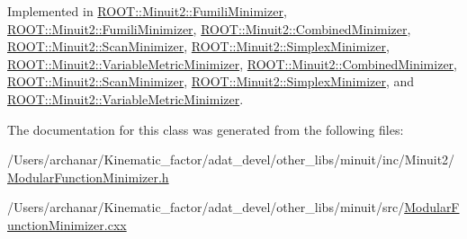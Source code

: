 Implemented in \mbox{\hyperlink{classROOT_1_1Minuit2_1_1FumiliMinimizer_ad8906dbac7f0c20284e361be606d5634}{R\+O\+O\+T\+::\+Minuit2\+::\+Fumili\+Minimizer}}, \mbox{\hyperlink{classROOT_1_1Minuit2_1_1FumiliMinimizer_ad8906dbac7f0c20284e361be606d5634}{R\+O\+O\+T\+::\+Minuit2\+::\+Fumili\+Minimizer}}, \mbox{\hyperlink{classROOT_1_1Minuit2_1_1CombinedMinimizer_a667ce6c321b6948d37087a2ac06be58c}{R\+O\+O\+T\+::\+Minuit2\+::\+Combined\+Minimizer}}, \mbox{\hyperlink{classROOT_1_1Minuit2_1_1ScanMinimizer_aaad34811cf2862cd8b66b634a1c9ba07}{R\+O\+O\+T\+::\+Minuit2\+::\+Scan\+Minimizer}}, \mbox{\hyperlink{classROOT_1_1Minuit2_1_1SimplexMinimizer_a7385d3ee5e4a48a796b11b51f7f0c408}{R\+O\+O\+T\+::\+Minuit2\+::\+Simplex\+Minimizer}}, \mbox{\hyperlink{classROOT_1_1Minuit2_1_1VariableMetricMinimizer_a8ac2123142283dd05611842236caeadb}{R\+O\+O\+T\+::\+Minuit2\+::\+Variable\+Metric\+Minimizer}}, \mbox{\hyperlink{classROOT_1_1Minuit2_1_1CombinedMinimizer_a667ce6c321b6948d37087a2ac06be58c}{R\+O\+O\+T\+::\+Minuit2\+::\+Combined\+Minimizer}}, \mbox{\hyperlink{classROOT_1_1Minuit2_1_1ScanMinimizer_aaad34811cf2862cd8b66b634a1c9ba07}{R\+O\+O\+T\+::\+Minuit2\+::\+Scan\+Minimizer}}, \mbox{\hyperlink{classROOT_1_1Minuit2_1_1SimplexMinimizer_a7385d3ee5e4a48a796b11b51f7f0c408}{R\+O\+O\+T\+::\+Minuit2\+::\+Simplex\+Minimizer}}, and \mbox{\hyperlink{classROOT_1_1Minuit2_1_1VariableMetricMinimizer_a8ac2123142283dd05611842236caeadb}{R\+O\+O\+T\+::\+Minuit2\+::\+Variable\+Metric\+Minimizer}}.



The documentation for this class was generated from the following files\+:\begin{DoxyCompactItemize}
\item 
/\+Users/archanar/\+Kinematic\+\_\+factor/adat\+\_\+devel/other\+\_\+libs/minuit/inc/\+Minuit2/\mbox{\hyperlink{other__libs_2minuit_2inc_2Minuit2_2ModularFunctionMinimizer_8h}{Modular\+Function\+Minimizer.\+h}}\item 
/\+Users/archanar/\+Kinematic\+\_\+factor/adat\+\_\+devel/other\+\_\+libs/minuit/src/\mbox{\hyperlink{ModularFunctionMinimizer_8cxx}{Modular\+Function\+Minimizer.\+cxx}}\end{DoxyCompactItemize}
